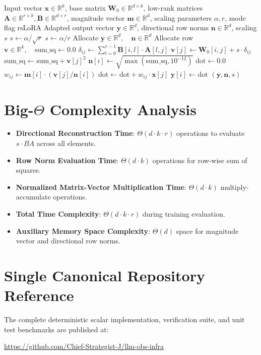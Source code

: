\documentclass[11pt,a4paper]{article}
\theoremstyle{definition}
\begin{document}
\begin{algorithm}[H]
\caption{DoRA Forward Evaluation and Directional Decomposition}
\begin{algorithmic}[1]
\Require Input vector $\mathbf{x} \in \mathbb{R}^k$, base matrix $\mathbf{W}_0 \in \mathbb{R}^{d \times k}$, low-rank matrices $\mathbf{A} \in \mathbb{R}^{r \times k}, \mathbf{B} \in \mathbb{R}^{d \times r}$, magnitude vector $\mathbf{m} \in \mathbb{R}^d$, scaling parameters $\alpha, r$, mode flag $\text{rsLoRA}$
\Ensure Adapted output vector $\mathbf{y} \in \mathbb{R}^d$, directional row norms $\mathbf{n} \in \mathbb{R}^d$, scaling $s$
    \State $s \gets \alpha / \sqrt{r}$
\Else
    \State $s \gets \alpha / r$
\EndIf
\State Allocate $\mathbf{y} \in \mathbb{R}^d, \quad \mathbf{n} \in \mathbb{R}^d$
    \State Allocate row $\mathbf{v} \in \mathbb{R}^k, \quad \text{sum\_sq} \gets 0.0$
        \State $\delta_{ij} \gets \sum_{l=0}^{r-1} \mathbf{B}[i, l] \cdot \mathbf{A}[l, j]$
        \State $\mathbf{v}[j] \gets \mathbf{W}_0[i, j] + s \cdot \delta_{ij}$
        \State $\text{sum\_sq} \gets \text{sum\_sq} + \mathbf{v}[j]^2$
    \EndFor
    \State $\mathbf{n}[i] \gets \sqrt{\max(\text{sum\_sq}, 10^{-12})}$
    \State $\text{dot} \gets 0.0$
        \State $w_{ij} \gets \mathbf{m}[i] \cdot \left(\mathbf{v}[j] / \mathbf{n}[i]\right)$
        \State $\text{dot} \gets \text{dot} + w_{ij} \cdot \mathbf{x}[j]$
    \EndFor
    \State $\mathbf{y}[i] \gets \text{dot}$
\EndFor
\State \Return $(\mathbf{y}, \mathbf{n}, s)$
\end{algorithmic}
\end{algorithm}

\section{Big-$\Theta$ Complexity Analysis}

\begin{itemize}
    \item \textbf{Directional Reconstruction Time}: $\Theta(d \cdot k \cdot r)$ operations to evaluate $s \cdot B A$ across all elements.
    \item \textbf{Row Norm Evaluation Time}: $\Theta(d \cdot k)$ operations for row-wise sum of squares.
    \item \textbf{Normalized Matrix-Vector Multiplication Time}: $\Theta(d \cdot k)$ multiply-accumulate operations.
    \item \textbf{Total Time Complexity}: $\Theta(d \cdot k \cdot r)$ during training evaluation.
    \item \textbf{Auxiliary Memory Space Complexity}: $\Theta(d)$ space for magnitude vector and directional row norms.
\end{itemize}

\section{Single Canonical Repository Reference}

The complete deterministic scalar implementation, verification suite, and unit test benchmarks are published at:
\begin{center}
\url{https://github.com/Chief-Strategist-J/llm-obs-infra}
\end{center}
\end{document}
